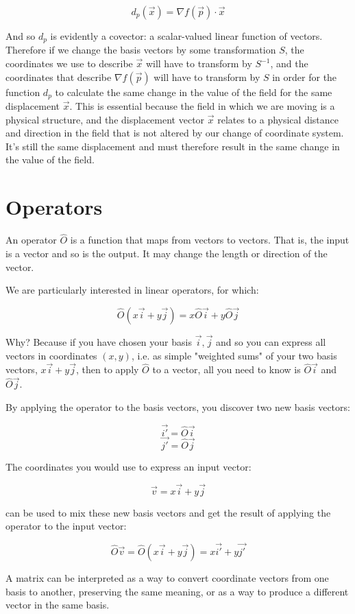 $$
d_p(\vec{x}) = \nabla f(\vec{p}) \cdot \vec{x}
$$

And so $d_p$ is evidently a covector: a scalar-valued linear function of vectors. Therefore if we change the basis vectors by some transformation $S$, the coordinates we use to describe $\vec{x}$ will have to transform by $S^{-1}$, and the coordinates that describe $\nabla f(\vec{p})$ will have to transform by $S$ in order for the function $d_p$ to calculate the same change in the value of the field for the same displacement $\vec{x}$. This is essential because the field in which we are moving is a physical structure, and the displacement vector $\vec{x}$ relates to a physical distance and direction in the field that is not altered by our change of coordinate system. It's still the same displacement and must therefore result in the same change in the value of the field.

\section{Operators}

An operator $\hat{O}$ is a function that maps from vectors to vectors. That is, the input is a vector and so is the output. It may change the length or direction of the vector.

We are particularly interested in linear operators, for which:

$$\hat{O}(x\vec{i} + y\vec{j}) = x\hat{O}\vec{i} + y\hat{O}\vec{j}$$

Why? Because if you have chosen your basis $\vec{i}, \vec{j}$ and so you can express all vectors in coordinates $(x, y)$, i.e. as simple "weighted sums" of your two basis vectors, $x\vec{i} + y\vec{j}$, then to apply $\hat{O}$ to a vector, all you need to know is $\hat{O}\vec{i}$ and $\hat{O}\vec{j}$.

By applying the operator to the basis vectors, you discover two new basis vectors:

$$\vec{i'} = \hat{O}\vec{i}$$
$$\vec{j'} = \hat{O}\vec{j}$$

The coordinates you would use to express an input vector:

$$\vec{v} = x\vec{i} + y\vec{j}$$

can be used to mix these new basis vectors and get the result of applying the operator to the input vector:

$$\hat{O}\vec{v} = \hat{O}(x\vec{i} + y\vec{j}) = x\vec{i'} + y\vec{j'}$$

A matrix can be interpreted as a way to convert coordinate vectors from one basis to another, preserving the same meaning, or as a way to produce a different vector in the same basis.

